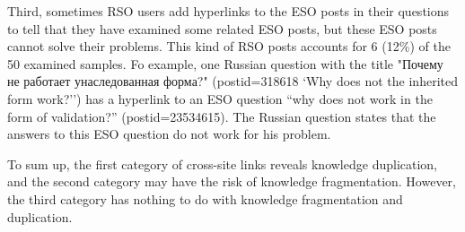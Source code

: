 Third, sometimes RSO users add hyperlinks to the ESO posts in their questions to tell that they have examined some related ESO posts, but these ESO posts cannot solve their problems.
This kind of RSO posts accounts for 6 (12\%) of the 50 examined samples.
Fo example, one Russian question with the title \foreignlanguage{russian}{"Почему не работает унаследованная форма?"} (postid=318618 `Why does not the inherited form work?'') has a hyperlink to an ESO question ``why does not work in the form of validation?'' (postid=23534615).
The Russian question states that the answers to this ESO question do not work for his problem. 

To sum up, the first category of cross-site links reveals knowledge duplication, and the second category may have the risk of knowledge fragmentation.
However, the third category has nothing to do with knowledge fragmentation and duplication.

